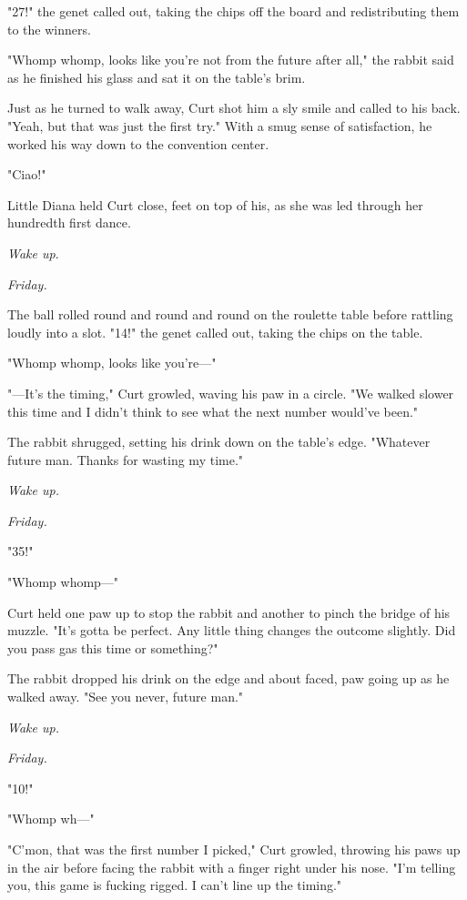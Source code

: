 "27!" the genet called out, taking the chips off the board and redistributing them to the winners.

"Whomp whomp, looks like you're not from the future after all," the rabbit said as he finished his glass and sat it on the table's brim.

Just as he turned to walk away, Curt shot him a sly smile and called to his back. "Yeah, but that was just the first try." With a smug sense of satisfaction, he worked his way down to the convention center.

"Ciao!"

Little Diana held Curt close, feet on top of his, as she was led through her hundredth first dance.

\emph{Wake up}.

\emph{Friday.}

The ball rolled round and round and round on the roulette table before rattling loudly into a slot. "14!" the genet called out, taking the chips on the table.

"Whomp whomp, looks like you're---"

"---It's the timing," Curt growled, waving his paw in a circle. "We walked slower this time and I didn't think to see what the next number would've been."

The rabbit shrugged, setting his drink down on the table's edge. "Whatever future man. Thanks for wasting my time."

\emph{Wake up.}

\emph{Friday.}

"35!"

"Whomp whomp---"

Curt held one paw up to stop the rabbit and another to pinch the bridge of his muzzle. "It's gotta be perfect. Any little thing changes the outcome slightly. Did you pass gas this time or something?"

The rabbit dropped his drink on the edge and about faced, paw going up as he walked away. "See you never, future man."

\emph{Wake up.}

\emph{Friday.}

"10!"

"Whomp wh---"

"C'mon, that was the first number I picked," Curt growled, throwing his paws up in the air before facing the rabbit with a finger right under his nose. "I'm telling you, this game is fucking rigged. I can't line up the timing."

